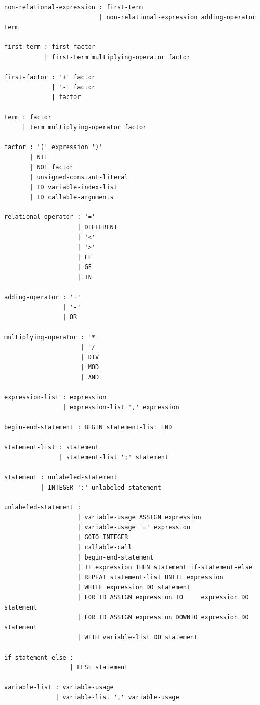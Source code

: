 \documentclass[12pt, a4paper]{article}
\begin{document}
\begin{lstlisting}
non-relational-expression : first-term
                          | non-relational-expression adding-operator term

first-term : first-factor
           | first-term multiplying-operator factor

first-factor : '+' factor
             | '-' factor
             | factor

term : factor
     | term multiplying-operator factor

factor : '(' expression ')'
       | NIL
       | NOT factor
       | unsigned-constant-literal
       | ID variable-index-list
       | ID callable-arguments

relational-operator : '='
                    | DIFFERENT
                    | '<'
                    | '>'
                    | LE
                    | GE
                    | IN

adding-operator : '+'
                | '-'
                | OR

multiplying-operator : '*'
                     | '/'
                     | DIV
                     | MOD
                     | AND

expression-list : expression
                | expression-list ',' expression

begin-end-statement : BEGIN statement-list END

statement-list : statement
               | statement-list ';' statement

statement : unlabeled-statement
          | INTEGER ':' unlabeled-statement

unlabeled-statement :
                    | variable-usage ASSIGN expression
                    | variable-usage '=' expression
                    | GOTO INTEGER
                    | callable-call
                    | begin-end-statement
                    | IF expression THEN statement if-statement-else
                    | REPEAT statement-list UNTIL expression
                    | WHILE expression DO statement
                    | FOR ID ASSIGN expression TO     expression DO statement
                    | FOR ID ASSIGN expression DOWNTO expression DO statement
                    | WITH variable-list DO statement

if-statement-else :
                  | ELSE statement

variable-list : variable-usage
              | variable-list ',' variable-usage
\end{lstlisting}
\end{document}
